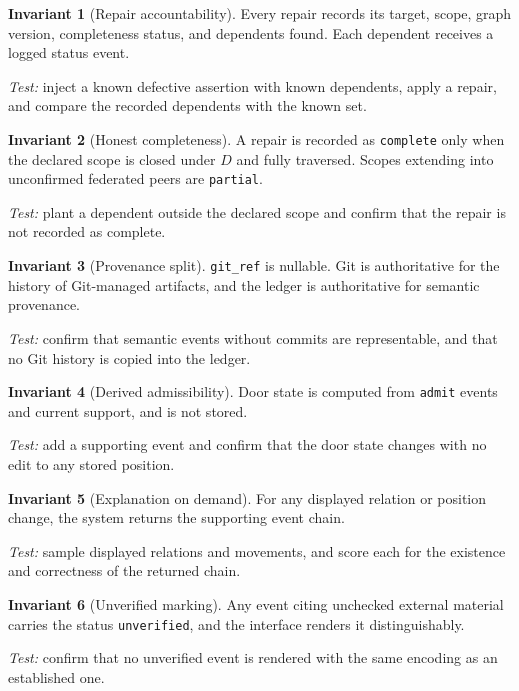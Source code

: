 \documentclass[11pt]{article}
\theoremstyle{definition}
\newtheorem{invariant}{Invariant}
\newcommand{\ev}[1]{\texttt{#1}}
\begin{document}
\begin{invariant}[Repair accountability]
Every repair records its target, scope, graph version, completeness status, and dependents found. Each dependent receives a logged status event.
\end{invariant}
\noindent\emph{Test:} inject a known defective assertion with known dependents, apply a repair, and compare the recorded dependents with the known set.

\begin{invariant}[Honest completeness]
A repair is recorded as \ev{complete} only when the declared scope is closed under $D$ and fully traversed. Scopes extending into unconfirmed federated peers are \ev{partial}.
\end{invariant}
\noindent\emph{Test:} plant a dependent outside the declared scope and confirm that the repair is not recorded as complete.

\begin{invariant}[Provenance split]
\ev{git\_ref} is nullable. Git is authoritative for the history of Git-managed artifacts, and the ledger is authoritative for semantic provenance.
\end{invariant}
\noindent\emph{Test:} confirm that semantic events without commits are representable, and that no Git history is copied into the ledger.

\begin{invariant}[Derived admissibility]
Door state is computed from \ev{admit} events and current support, and is not stored.
\end{invariant}
\noindent\emph{Test:} add a supporting event and confirm that the door state changes with no edit to any stored position.

\begin{invariant}[Explanation on demand]
For any displayed relation or position change, the system returns the supporting event chain.
\end{invariant}
\noindent\emph{Test:} sample displayed relations and movements, and score each for the existence and correctness of the returned chain.

\begin{invariant}[Unverified marking]
Any event citing unchecked external material carries the status \ev{unverified}, and the interface renders it distinguishably.
\end{invariant}
\noindent\emph{Test:} confirm that no unverified event is rendered with the same encoding as an established one.
\end{document}
